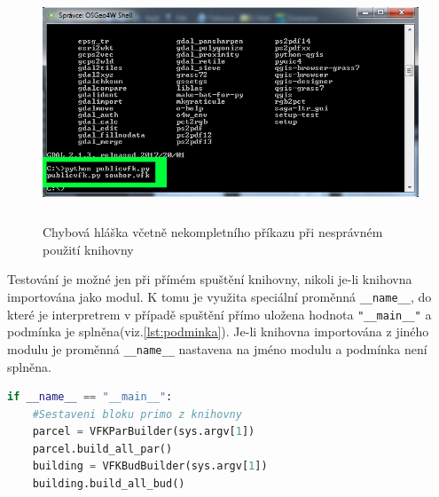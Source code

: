 \begin{figure}[H]
	 \centering
      \includegraphics[height=7cm]{./pictures/testovani_hlaska.png}
      \caption{Chybová hláška včetně nekompletního příkazu při nesprávném použití knihovny}
      \label{fig:testovani_hlaska}
  \end{figure}

Testování je možné jen při přímém spuštění knihovny, nikoli je-li
knihovna importována jako modul. K tomu je využita speciální proměnná
\verb|__name__|, do které je interpretrem v případě spuštění přímo
uložena hodnota \verb|"__main__"| a podmínka je
splněna(viz.\ref{lst:podminka}). Je-li knihovna importována z jiného
modulu je proměnná \verb|__name__| nastavena na jméno modulu a
podmínka není splněna.
\begin{lstlisting}[caption=Ukázka sestavení bloků provedeném jen při přímém spuštění knihovny, language=Python, numbers=none, label=lst:podminka]
if __name__ == "__main__":
	#Sestaveni bloku primo z knihovny
    parcel = VFKParBuilder(sys.argv[1])
    parcel.build_all_par()
    building = VFKBudBuilder(sys.argv[1])
    building.build_all_bud()
\end{lstlisting}
